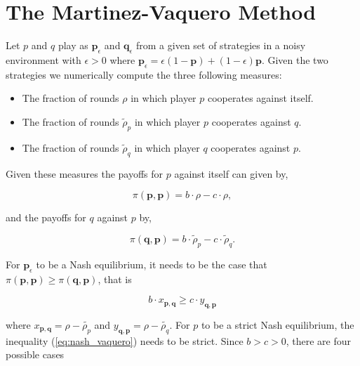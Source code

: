 \documentclass{article}
\theoremstyle{definition}
\begin{document}
\appendix

\section{The Martinez-Vaquero Method}\label{section:matrinez_vaquero_method}

Let \(p\) and \(q\) play as \(\mathbf{p}_{\epsilon}\) and
\(\mathbf{q}_{\epsilon}\) from a given set of strategies in a noisy environment
with \(\epsilon > 0\) where \(\mathbf{p}_{\epsilon} = \epsilon(1 - \mathbf{p}) +
(1 - \epsilon)\mathbf{p} \). Given the two strategies we numerically compute
the three following measures:


\begin{itemize}
  \item The fraction of rounds \(\rho\) in which player \(p\) cooperates against itself.
  \item The fraction of rounds \(\tilde{\rho}_p\) in which player \(p\) cooperates against \(q\).
  \item The fraction of rounds \(\tilde{\rho}_q\) in which player \(q\) cooperates against \(p\).
\end{itemize}

Given these measures the payoffs for \(p\) against itself can given by,

\[\pi (\mathbf{p}, \mathbf{p}) = b \cdot \rho - c\cdot\rho,\]

and the payoffs for \(q\) against \(p\) by,

\[\pi(\mathbf{q}, \mathbf{p}) = b \cdot \tilde{\rho}_p - c\cdot\tilde{\rho}_q.\]

For \(\mathbf{p}_{\epsilon}\) to be a Nash equilibrium, it needs to be the case that \(\pi (\mathbf{p}, \mathbf{p}) \geq
\pi(\mathbf{q}, \mathbf{p})\), that is

\begin{equation}\label{eq:nash_vaquero}
  b \cdot x_{\mathbf{p}, \mathbf{q}} \geq c \cdot y_{\mathbf{q}, \mathbf{p}}
\end{equation}

where \(x_{\mathbf{p}, \mathbf{q}} = \rho - \tilde{\rho_p}\) and  \(y_{\mathbf{q}, \mathbf{p}} = \rho - \tilde{\rho_q}\).
For \(p\) to be a strict Nash equilibrium, the inequality (\ref{eq:nash_vaquero}) needs
to be strict. Since \(b > c > 0\), there are four possible cases
\end{document}
